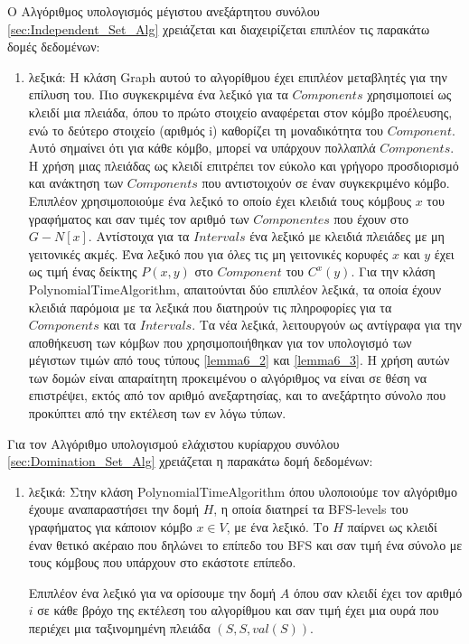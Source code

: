 Ο Αλγόριθμος υπολογισμός μέγιστου ανεξάρτητου συνόλου \ref{sec:Independent_Set_Alg} χρειάζεται και διαχειρίζεται επιπλέον τις παρακάτω δομές δεδομένων:
\begin{enumerate}
	\item λεξικά: Η κλάση Graph αυτού το αλγορίθμου έχει επιπλέον μεταβλητές για την επίλυση του. Πιο συγκεκριμένα ένα λεξικό για τα $Components$ χρησιμοποιεί ως κλειδί μια πλειάδα, όπου το πρώτο στοιχείο αναφέρεται στον κόμβο προέλευσης, ενώ το δεύτερο στοιχείο (αριθμός i) καθορίζει τη μοναδικότητα του $Component$. Αυτό σημαίνει ότι για κάθε κόμβο, μπορεί να υπάρχουν πολλαπλά $Components$. Η χρήση μιας πλειάδας ως κλειδί επιτρέπει τον εύκολο και γρήγορο προσδιορισμό και ανάκτηση των $Components$ που αντιστοιχούν σε έναν συγκεκριμένο κόμβο. Επιπλέον χρησιμοποιούμε ένα λεξικό το οποίο έχει κλειδιά τους κόμβους $x$ του γραφήματος και σαν τιμές τον αριθμό των $Componentes$ που έχουν στο $G - N[x]$. Αντίστοιχα για τα $Intervals$ ένα λεξικό με κλειδιά πλειάδες με μη γειτονικές ακμές. Ένα λεξικό που για όλες τις μη γειτονικές κορυφές $x$ και $y$ έχει ως τιμή ένας δείκτης $P(x, y)$ στο $Component$
	του $C^x(y)$. Για την κλάση PolynomialTimeAlgorithm, απαιτούνται δύο επιπλέον λεξικά, τα οποία έχουν κλειδιά παρόμοια με τα λεξικά που διατηρούν τις πληροφορίες για τα $Components$ και τα $Intervals$. Τα νέα λεξικά, λειτουργούν ως αντίγραφα για την αποθήκευση των κόμβων που χρησιμοποιήθηκαν για τον υπολογισμό των μέγιστων τιμών από τους τύπους \ref{lemma6_2} και \ref{lemma6_3}. Η χρήση αυτών των δομών είναι απαραίτητη προκειμένου ο αλγόριθμος να είναι σε θέση να επιστρέψει, εκτός από τον αριθμό ανεξαρτησίας, και το ανεξάρτητο σύνολο που προκύπτει από την εκτέλεση των εν λόγω τύπων.
\end{enumerate}

Για τον Αλγόριθμο υπολογισμού ελάχιστου κυρίαρχου συνόλου \ref{sec:Domination_Set_Alg} χρειάζεται η παρακάτω δομή δεδομένων:
\begin{enumerate}
	\item λεξικά: Στην κλάση PolynomialTimeAlgorithm όπου υλοποιούμε τον αλγόριθμο έχουμε αναπαραστήσει την δομή $H$, η οποία 
	διατηρεί τα BFS-levels του γραφήματος για κάποιον κόμβο $x \in V$, με ένα λεξικό. Το $Η$ παίρνει ως κλειδί έναν θετικό ακέραιο που δηλώνει το επίπεδο του BFS και σαν τιμή ένα σύνολο  με τους κόμβους που υπάρχουν στο εκάστοτε επίπεδο. 
	
	Επιπλέον ένα λεξικό για να ορίσουμε την δομή $A$ όπου σαν κλειδί έχει τον αριθμό $i$ σε κάθε βρόχο της εκτέλεση του αλγορίθμου και σαν τιμή έχει μια ουρά που περιέχει μια ταξινομημένη πλειάδα $(S, S, val(S))$.
\end{enumerate}

